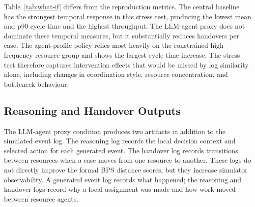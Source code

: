 Table~\ref{tab:what-if} differs from the reproduction metrics. The
central baseline has the strongest temporal response in this stress
test, producing the lowest mean and p90 cycle time and the highest
throughput. The LLM-agent proxy does not dominate these temporal
measures, but it substantially reduces handovers per case. The
agent-profile policy relies most heavily on the constrained
high-frequency resource group and shows the largest cycle-time increase.
The stress test therefore captures intervention effects that would be
missed by log similarity alone, including changes in coordination style,
resource concentration, and bottleneck behaviour.

\subsection{Reasoning and Handover
Outputs}\label{reasoning-and-handover-outputs}

The LLM-agent proxy condition produces two artifacts in addition to the
simulated event log. The reasoning log records the local decision
context and selected action for each generated event. The handover log
records transitions between resources when a case moves from one
resource to another. These logs do not directly improve the formal BPS
distance scores, but they increase simulator observability. A generated
event log records what happened; the reasoning and handover logs record
why a local assignment was made and how work moved between resource
agents.
